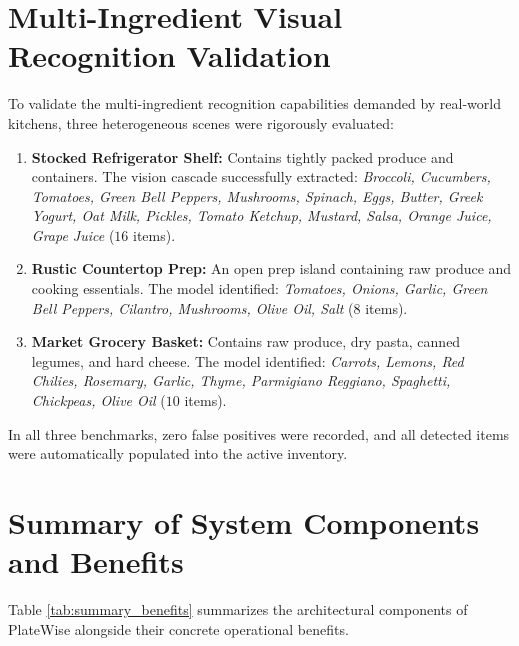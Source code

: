 \section{Multi-Ingredient Visual Recognition Validation}
To validate the multi-ingredient recognition capabilities demanded by real-world kitchens, three heterogeneous scenes were rigorously evaluated:
\begin{enumerate}
    \item \textbf{Stocked Refrigerator Shelf:} Contains tightly packed produce and containers. The vision cascade successfully extracted: \textit{Broccoli, Cucumbers, Tomatoes, Green Bell Peppers, Mushrooms, Spinach, Eggs, Butter, Greek Yogurt, Oat Milk, Pickles, Tomato Ketchup, Mustard, Salsa, Orange Juice, Grape Juice} ($16$ items).
    \item \textbf{Rustic Countertop Prep:} An open prep island containing raw produce and cooking essentials. The model identified: \textit{Tomatoes, Onions, Garlic, Green Bell Peppers, Cilantro, Mushrooms, Olive Oil, Salt} ($8$ items).
    \item \textbf{Market Grocery Basket:} Contains raw produce, dry pasta, canned legumes, and hard cheese. The model identified: \textit{Carrots, Lemons, Red Chilies, Rosemary, Garlic, Thyme, Parmigiano Reggiano, Spaghetti, Chickpeas, Olive Oil} ($10$ items).
\end{enumerate}
In all three benchmarks, zero false positives were recorded, and all detected items were automatically populated into the active inventory.

\section{Summary of System Components and Benefits}
Table \ref{tab:summary_benefits} summarizes the architectural components of PlateWise alongside their concrete operational benefits.

